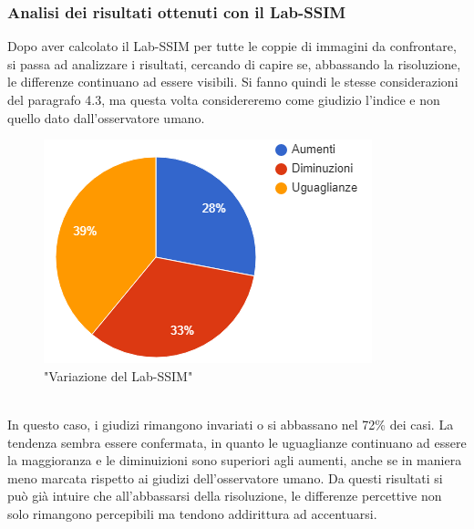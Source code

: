\documentclass[a4paper,11pt]{article}
\begin{document}
    \subsubsection{Analisi dei risultati ottenuti con il Lab-SSIM}
    Dopo aver calcolato il Lab-SSIM per tutte le coppie di immagini da confrontare, si passa ad analizzare i risultati, cercando di capire
    se, abbassando la risoluzione, le differenze continuano ad essere visibili. Si fanno quindi le stesse considerazioni del paragrafo 4.3, ma questa volta
    considereremo come giudizio l'indice e non quello dato dall'osservatore umano.
    \begin{figure}[h]
        \centering
        \includegraphics{chart2}
        \caption{"Variazione del Lab-SSIM"}
    \end{figure}
    \\In questo caso, i giudizi rimangono invariati o si abbassano nel 72\% dei casi. La tendenza sembra essere confermata, in quanto le uguaglianze continuano ad essere la maggioranza e le diminuizioni sono superiori agli aumenti, anche se in maniera meno marcata rispetto ai giudizi dell'osservatore umano.
    Da questi risultati si può già intuire che all'abbassarsi della risoluzione, le differenze percettive non solo rimangono percepibili ma tendono addirittura ad accentuarsi.
    \newpage
\end{document}

